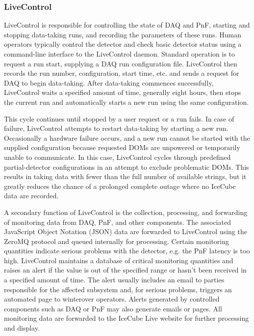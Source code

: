 \subsubsection{LiveControl}

LiveControl is responsible for controlling the state of DAQ and PnF, starting and
stopping data-taking runs, and recording the parameters of these runs.
Human operators typically control the detector and check basic 
detector status using a command-line interface to the LiveControl
daemon. Standard operation is to 
request a run start, supplying a DAQ run configuration 
file.  LiveControl then records the run number, configuration, start time,
etc. and sends a request 
for DAQ to begin data-taking.  After data-taking commences successfully,
LiveControl waits a specified amount of time, generally eight hours, then
stops the current run and automatically starts a new run using the same
configuration.

This cycle continues until stopped by a user request or a
run fails.  In case of failure, LiveControl attempts to restart data-taking
by starting a new run.  Occasionally a hardware failure occurs, and a new
run cannot be started with the supplied configuration because requested
DOMs are unpowered or temporarily unable to communicate.  In this case,
LiveControl cycles through predefined partial-detector 
configurations in an attempt to exclude problematic DOMs.  This results in
taking data with fewer than the full number of available strings, but it
greatly reduces the chance of a prolonged complete outage where no IceCube
data are recorded.

A secondary function of LiveControl is the collection, processing, and
forwarding of monitoring data from DAQ, PnF, and other
components.  The associated JavaScript Object Notation (JSON) data are
forwarded to LiveControl using the ZeroMQ protocol and queued internally 
for processing.  Certain monitoring quantities indicate serious problems with
the detector, e.g. the PnF latency is too high.  LiveControl
maintains a database of critical monitoring quantities and raises an alert
if the value is out of the specified range or 
hasn't been received in a specified amount of time.  The alert usually
includes an email to parties responsible for the affected subsystem and,
for serious problems, triggers an automated page to winterover operators.
Alerts generated by controlled components such as DAQ or PnF may also
generate emails or pages.
All monitoring data are forwarded to the IceCube Live website for further
processing and display.

